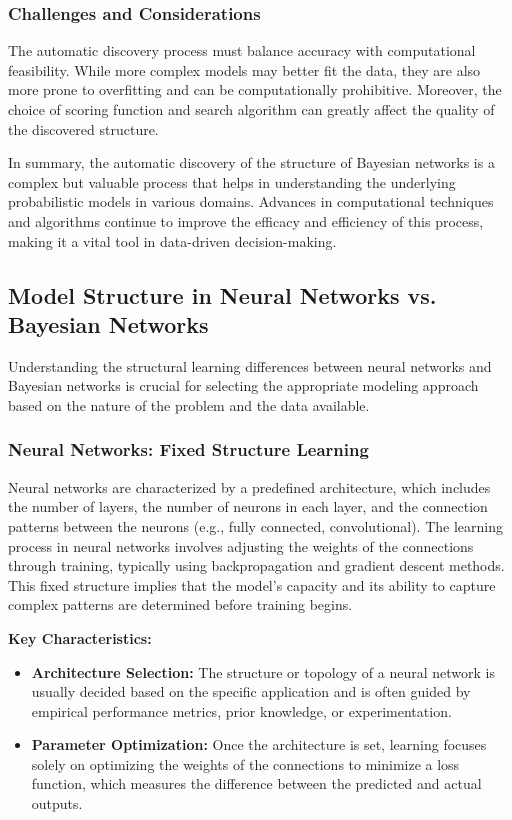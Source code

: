 \subsubsection{Challenges and Considerations}
The automatic discovery process must balance accuracy with computational feasibility. While more complex models may better fit the data, they are also more prone to overfitting and can be computationally prohibitive. Moreover, the choice of scoring function and search algorithm can greatly affect the quality of the discovered structure.

In summary, the automatic discovery of the structure of Bayesian networks is a complex but valuable process that helps in understanding the underlying probabilistic models in various domains. Advances in computational techniques and algorithms continue to improve the efficacy and efficiency of this process, making it a vital tool in data-driven decision-making.

\subsection{Model Structure in Neural Networks vs. Bayesian Networks}

Understanding the structural learning differences between neural networks and Bayesian networks is crucial for selecting the appropriate modeling approach based on the nature of the problem and the data available.

\subsubsection{Neural Networks: Fixed Structure Learning}
Neural networks are characterized by a predefined architecture, which includes the number of layers, the number of neurons in each layer, and the connection patterns between the neurons (e.g., fully connected, convolutional). The learning process in neural networks involves adjusting the weights of the connections through training, typically using backpropagation and gradient descent methods. This fixed structure implies that the model's capacity and its ability to capture complex patterns are determined before training begins.

\textbf{Key Characteristics:}
\begin{itemize}
    \item \textbf{Architecture Selection:} The structure or topology of a neural network is usually decided based on the specific application and is often guided by empirical performance metrics, prior knowledge, or experimentation.
    \item \textbf{Parameter Optimization:} Once the architecture is set, learning focuses solely on optimizing the weights of the connections to minimize a loss function, which measures the difference between the predicted and actual outputs.
\end{itemize}

